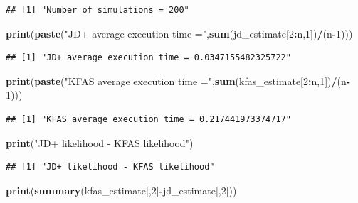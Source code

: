 \documentclass[]{article}
\newenvironment{Shaded}{\begin{snugshade}}{\end{snugshade}}
\newcommand{\KeywordTok}[1]{\textcolor[rgb]{0.13,0.29,0.53}{\textbf{#1}}}
\newcommand{\DecValTok}[1]{\textcolor[rgb]{0.00,0.00,0.81}{#1}}
\newcommand{\StringTok}[1]{\textcolor[rgb]{0.31,0.60,0.02}{#1}}
\newcommand{\OperatorTok}[1]{\textcolor[rgb]{0.81,0.36,0.00}{\textbf{#1}}}
\newcommand{\NormalTok}[1]{#1}
\begin{document}
\begin{verbatim}
## [1] "Number of simulations = 200"
\end{verbatim}

\begin{Shaded}
\begin{Highlighting}[]
\KeywordTok{print}\NormalTok{(}\KeywordTok{paste}\NormalTok{(}\StringTok{"JD+ average execution time ="}\NormalTok{,}\KeywordTok{sum}\NormalTok{(jd_estimate[}\DecValTok{2}\OperatorTok{:}\NormalTok{n,}\DecValTok{1}\NormalTok{])}\OperatorTok{/}\NormalTok{(n}\OperatorTok{-}\DecValTok{1}\NormalTok{)))}
\end{Highlighting}
\end{Shaded}

\begin{verbatim}
## [1] "JD+ average execution time = 0.0347155482325722"
\end{verbatim}

\begin{Shaded}
\begin{Highlighting}[]
\KeywordTok{print}\NormalTok{(}\KeywordTok{paste}\NormalTok{(}\StringTok{"KFAS average execution time ="}\NormalTok{,}\KeywordTok{sum}\NormalTok{(kfas_estimate[}\DecValTok{2}\OperatorTok{:}\NormalTok{n,}\DecValTok{1}\NormalTok{])}\OperatorTok{/}\NormalTok{(n}\OperatorTok{-}\DecValTok{1}\NormalTok{)))}
\end{Highlighting}
\end{Shaded}

\begin{verbatim}
## [1] "KFAS average execution time = 0.217441973374717"
\end{verbatim}

\begin{Shaded}
\begin{Highlighting}[]
\KeywordTok{print}\NormalTok{(}\StringTok{"JD+ likelihood - KFAS likelihood"}\NormalTok{)}
\end{Highlighting}
\end{Shaded}

\begin{verbatim}
## [1] "JD+ likelihood - KFAS likelihood"
\end{verbatim}

\begin{Shaded}
\begin{Highlighting}[]
\KeywordTok{print}\NormalTok{(}\KeywordTok{summary}\NormalTok{(kfas_estimate[,}\DecValTok{2}\NormalTok{]}\OperatorTok{-}\NormalTok{jd_estimate[,}\DecValTok{2}\NormalTok{]))}
\end{Highlighting}
\end{Shaded}
\end{document}
